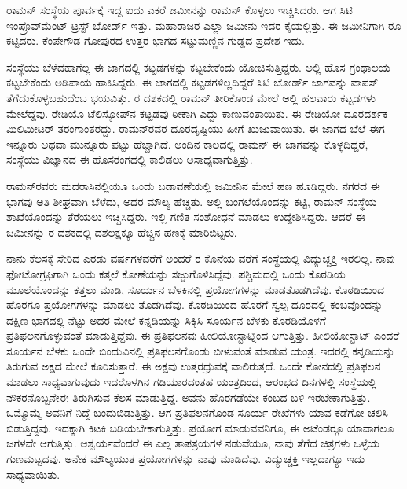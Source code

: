 ರಾಮನ್ ಸಂಸ್ಥೆಯ ಪೂರ್ವಕ್ಕೆ ಇದ್ದ ಐದು ಎಕರೆ ಜಮೀನನ್ನು ರಾಮನ್ ಕೊಳ್ಳಲು ಇಚ್ಚಿಸಿದರು. ಆಗ ಸಿಟಿ ಇಂಪ್ರೊವ್‍ಮೆಂಟ್ ಟ್ರಸ್ಟ್ ಬೋರ್ಡ್ ಇತ್ತು. ಮಹಾರಾಜರ ಎಲ್ಲಾ ಜಮೀನು ಇದರ ಕೈಯಲ್ಲಿತ್ತು. ಈ ಜಮೀನಿಗಾಗಿ  ರೂ ಕಟ್ಟಿದರು. ಕೆಂಪೇಗೌಡ ಗೋಪುರದ ಉತ್ತರ ಭಾಗದ ಸಟ್ಟುಮಣ್ಣಿನ ಗುಡ್ಡದ ಪ್ರದೇಶ ಇದು.

ಸಂಸ್ಥೆಯು ಬೆಳೆದಹಾಗೆಲ್ಲ ಈ ಜಾಗದಲ್ಲಿ ಕಟ್ಟಡಗಳನ್ನು ಕಟ್ಟಬೇಕೆಂದು ಯೋಚಿಸುತ್ತಿದ್ದರು. ಅಲ್ಲಿ ಹೊಸ ಗ್ರಂಥಾಲಯ ಕಟ್ಟಬೇಕೆಂದು ಅಡಿಪಾಯ ಹಾಕಿಸಿದ್ದರು. ಈ ಜಾಗದಲ್ಲಿ ಕಟ್ಟಡಗಳಿಲ್ಲದಿದ್ದರೆ ಸಿಟಿ ಬೋರ್ಡ್ ಜಾಗವನ್ನು ವಾಪಸ್ ತೆಗೆದುಕೊಳ್ಳಬಹುದೆಂಬ ಭಯವಿತ್ತು. ರ ದಶಕದಲ್ಲಿ ರಾಮನ್ ತೀರಿಕೊಂಡ ಮೇಲೆ ಅಲ್ಲಿ ಹಲವಾರು ಕಟ್ಟಡಗಳು ಮೇಲೆದ್ದವು. ರೇಡಿಯೊ ಟೆಲಿಸ್ಕೋಪ್‍ನ ಕಟ್ಟಡವು ಠೀಕಾಗಿ ಎದ್ದು ಕಾಣುವಂತಾಯಿತು. ಈ ರೇಡಿಯೋ ದೂರದರ್ಶಕ ಮಿಲಿಮೀಟರ್ ತರಂಗಾಂತರದ್ದು. ರಾಮನ್‍ರವರ ದೂರದೃಷ್ಟಿಯು ಹೀಗೆ ಖುಜುವಾಯಿತು. ಈ ಜಾಗದ ಬೆಲೆ ಈಗ ಇನ್ನೂರು ಅಥವಾ ಮುನ್ನೂರು ಪಟ್ಟು ಹೆಚ್ಚಾಗಿದೆ. ಅಂದಿನ ಕಾಲದಲ್ಲಿ ರಾಮನ್ ಈ ಜಾಗವನ್ನು ಕೊಳ್ಳದಿದ್ದರೆ, ಸಂಸ್ಥೆಯು ವಿಜ್ಞಾನದ ಈ ಹೊಸರಂಗದಲ್ಲಿ ಕಾಲಿಡಲು ಅಸಾಧ್ಯವಾಗುತ್ತಿತ್ತು.

ರಾಮನ್‍ರವರು ಮದರಾಸಿನಲ್ಲಿಯೂ ಒಂದು ಬಡಾವಣೆಯಲ್ಲಿ ಜಮೀನಿನ ಮೇಲೆ ಹಣ ಹೂಡಿದ್ದರು. ನಗರದ ಈ ಭಾಗವು ಅತಿ ಶೀಘ್ರವಾಗಿ ಬೆಳೆದು, ಅದರ ಮೌಲ್ಯ ಹೆಚ್ಚಿತು. ಅಲ್ಲಿ ಬಂಗಲೆಯೊಂದನ್ನು ಕಟ್ಟಿ, ರಾಮನ್ ಸಂಸ್ಥೆಯ ಶಾಖೆಯೊಂದನ್ನು ತೆರೆಯಲು ಇಚ್ಚಿಸಿದ್ದರು. ಇಲ್ಲಿ ಗಣಿತ ಸಂಶೋಧನೆ ಮಾಡಲು ಉದ್ದೇಶಿಸಿದ್ದರು. ಆದರೆ ಈ ಜಮೀನನ್ನು ರ ದಶಕದಲ್ಲಿ ದಶಲಕ್ಷಕ್ಕೂ ಹೆಚ್ಚಿನ ಹಣಕ್ಕೆ ಮಾರಿಬಿಟ್ಟರು.



ನಾನು ಕೆಲಸಕ್ಕೆ ಸೇರಿದ ಎರಡು ವರ್ಷಗಳವರೆಗೆ ಅಂದರೆ ರ ಕೊನೆಯ ವರೆಗೆ ಸಂಸ್ಥೆಯಲ್ಲಿ ವಿದ್ಯುಚ್ಚಕ್ತಿ ಇರಲಿಲ್ಲ. ನಾವು ಫೋಟೋಗ್ರಫಿಗಾಗಿ ಒಂದು ಕತ್ತಲೆ ಕೋಣೆಯನ್ನು ಸಜ್ಜುಗೊಳಿಸಿದ್ದೆವು. ಪಶ್ಚಿಮದಲ್ಲಿ ಒಂದು ಕೊಠಡಿಯ ಮೂಲೆಯೊಂದನ್ನು ಕತ್ತಲು ಮಾಡಿ, ಸೂರ್ಯನ ಬೆಳಕಿನಲ್ಲಿ ಪ್ರಯೋಗಗಳನ್ನು ಮಾಡತೊಡಗಿದೆವು. ಕೊಠಡಿಯಿಂದ ಹೊರಗೂ ಪ್ರಯೋಗಗಳನ್ನು ಮಾಡಲು ತೊಡಗಿದೆವು. ಕೊಠಡಿಯಿಂದ ಹೊರಗೆ ಸ್ವಲ್ಪ ದೂರದಲ್ಲಿ ಕಂಬವೊಂದನ್ನು ದಕ್ಷಿಣ ಭಾಗದಲ್ಲಿ ನೆಟ್ಟು ಅದರ ಮೇಲೆ ಕನ್ನಡಿಯನ್ನು ಸಿಕ್ಕಿಸಿ ಸೂರ್ಯನ ಬೆಳಕು ಕೊಠಡಿಯೊಳಗೆ ಪ್ರತಿಫಲನಗೊಳ್ಳುವಂತೆ ಮಾಡುತ್ತಿದ್ದೆವು. ಈ ಪ್ರತಿಫಲನವು ಹೀಲಿಯೋಸ್ಟಾಟ್ನಿಂದ ಆಗುತ್ತಿತ್ತು. ಹೀಲಿಯೋಸ್ಟಾಟ್ ಎಂದರೆ ಸೂರ್ಯನ ಬೆಳಕು ಒಂದೇ ಬಿಂದುವಿನಲ್ಲಿ ಪ್ರತಿಫಲನಗೊಂಡು ಬೀಳುವಂತೆ ಮಾಡುವ ಯಂತ್ರ. ಇದರಲ್ಲಿ ಕನ್ನಡಿಯನ್ನು ತಿರುಗುವ ಅಕ್ಷದ ಮೇಲೆ ಕೂರಿಸುತ್ತಾರೆ. ಈ ಅಕ್ಷವು ಉತ್ತರಧ್ರುವಕ್ಕೆ ವಾಲಿರುತ್ತದೆ. ಒಂದೇ ಕೋನದಲ್ಲಿ ಪ್ರತಿಫಲನ ಮಾಡಲು ಸಾಧ್ಯವಾಗುವುದು ಇದರೊಳಗಿನ ಗಡಿಯಾರದಂತಹ ಯಂತ್ರದಿಂದ, ಆರಂಭದ ದಿನಗಳಲ್ಲಿ ಸಂಸ್ಥೆಯಲ್ಲಿ ನೌಕರನೊಬ್ಬನೇ\break ಈ ತಿರುಗಿಸುವ ಕೆಲಸ ಮಾಡುತ್ತಿದ್ದ. ಅವನು ಹೊರಗಡೆಯೇ ಕಂಬದ ಬಳಿ ಇರಬೇಕಾಗುತ್ತಿತ್ತು. ಒಮ್ಮೊಮ್ಮೆ ಅವನಿಗೆ ನಿದ್ದೆ ಬಂದುಬಿಡುತ್ತಿತ್ತು. ಆಗ ಪ್ರತಿಫಲನಗೊಂಡ ಸೂರ್ಯ ರೇಖೆಗಳು ಯಾವ ಕಡೆಗೋ ಚಲಿಸಿ ಬಿಡುತ್ತಿದ್ದವು. ಇದಕ್ಕಾಗಿ ಕಿಟಕಿ ಬಡಿಯಬೇಕಾಗುತ್ತಿತ್ತು. ಪ್ರಯೋಗ ಮಾಡುವವನಿಗೂ, ಈ ಅಟೆಂಡರ್‍ಗೂ ಯಾವಾಗಲೂ ಜಗಳವೇ ಆಗುತ್ತಿತ್ತು. ಆಶ್ವರ್ಯವೆಂದರೆ ಈ ಎಲ್ಲ ತಾಪತ್ರಯಗಳ ನಡುವೆಯೂ, ನಾವು ತೆಗೆದ ಚಿತ್ರಗಳು ಒಳ್ಳೆಯ ಗುಣಮಟ್ಟದವು. ಅನೇಕ ಮೌಲ್ಯಯುತ ಪ್ರಯೋಗಗಳನ್ನು ನಾವು ಮಾಡಿದೆವು. ವಿದ್ಯುಚ್ಚಕ್ತಿ ಇಲ್ಲದಾಗ್ಯೂ ಇದು ಸಾಧ್ಯವಾಯಿತು.


